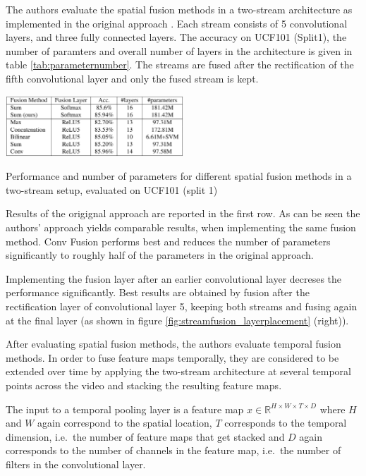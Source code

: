 The authors evaluate the spatial fusion methods in a two-stream architecture as implemented in the original approach \cite{simonyan_two-stream_2014}.
Each stream consists of 5 convolutional layers, and three fully connected layers.
The accuracy on UCF101 (Split1), the number of paramters and overall number of layers in the architecture is given in table \ref{tab:parameternumber}.
The streams are fused after the rectification of the fifth convolutional layer and only the fused stream is kept.

\begin{table}
    \centering
    \includegraphics[width=0.5\textwidth]{img_deep/streamfusion_parameternumber}
    \caption{Performance and number of parameters for different spatial fusion methods in a two-stream setup, evaluated on UCF101 (split 1) \cite{feichtenhofer_convolutional_2016}}
    \label{tab:streamfusion_parameternumber}
\end{table}

Results of the origignal approach are reported in the first row.
As can be seen the authors' approach yields comparable results, when implementing the same fusion method.
Conv Fusion performs best and reduces the number of parameters significantly to roughly half of the parameters in the original approach.

Implementing the fusion layer after an earlier convolutional layer decreses the performance significantly.
Best results are obtained by fusion after the rectification layer of convolutional layer 5, keeping both streams and fusing again at the final layer (as shown in figure \ref{fig:streamfusion_layerplacement} (right)).

After evaluating spatial fusion methods, the authors evaluate temporal fusion methods.
In order to fuse feature maps temporally, they are considered to be extended over time by applying the two-stream architecture at several temporal points across the video and stacking the resulting feature maps.

The input to a temporal pooling layer is a feature map $x \in \mathbb{R}^{H \times W \times T \times D}$ where $H$ and $W$ again correspond to the spatial location, $T$ corresponds to the temporal dimension, i.e.\ the number of feature maps that get stacked and $D$ again corresponds to the number of channels in the feature map, i.e.\ the number of filters in the convolutional layer.

